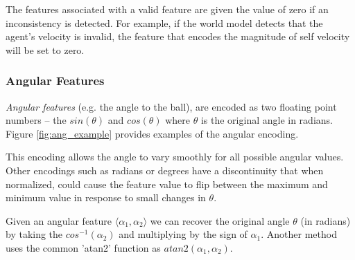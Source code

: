 \documentclass[12pt]{article}
\begin{document}
The features associated with a valid feature are given the value of
zero if an inconsistency is detected. For example, if the world model
detects that the agent's velocity is invalid, the feature that encodes
the magnitude of self velocity will be set to zero.

\subsubsection{Angular Features}
\textit{Angular features} (e.g. the angle to the ball), are encoded as
two floating point numbers -- the $sin(\theta)$ and $cos(\theta)$
where $\theta$ is the original angle in radians. Figure
\ref{fig:ang_example} provides examples of the angular encoding.

This encoding allows the angle to vary smoothly for all possible
angular values. Other encodings such as radians or degrees have a
discontinuity that when normalized, could cause the feature value to
flip between the maximum and minimum value in response to small
changes in $\theta$.

Given an angular feature $\langle \alpha_1, \alpha_2 \rangle$ we can
recover the original angle $\theta$ (in radians) by taking the
$cos^{-1}(\alpha_2)$ and multiplying by the sign of $\alpha_1$.
Another method uses the common 'atan2' function as
$atan2(\alpha_1, \alpha_2)$.

\begin{figure*}[htp]
  \centering
  \hspace{3em}
  \caption{\textbf{Angular Encoding:} Objects on the agents left/right
    side result in a negative/positive $sin(\theta)$. $cos(\theta)$ is
    positive in front of the player and negative behind. For example,
    an object directly in front of the player would have angular
    features of $sin(\theta)=0, cos(\theta)=1$. Additional examples:
    \textbf{Angle to ball} $\theta=60^\circ$ or $1.0472$ radians. This
    results in angular features $\langle sin(\theta)=.86,
    cos(\theta)=.49 \rangle$. \textbf{Angle to teammate}:
    $\theta=135^\circ, 2.35$ radians. $\langle sin(\theta)=.71,
    cos(\theta)=-.71 \rangle$. \textbf{Angle to Opponent}:
    $\theta=-90^\circ$ or $-1.57$ radians. $\langle sin(\theta)=-1,
    cos(\theta)=0 \rangle$.}
  \label{fig:ang_example}
\end{figure*}
\end{document}

